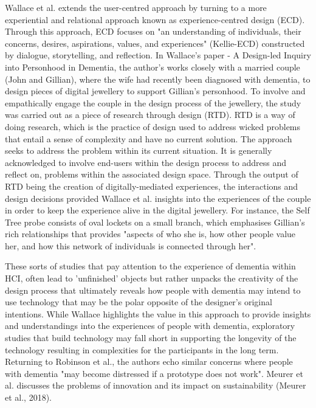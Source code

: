Wallace et al. extends the user-centred approach by turning to a more experiential and relational approach known as experience-centred design (ECD). Through this approach, ECD focuses on "an understanding of individuals, their concerns, desires, aspirations, values, and experiences" (Kellie-ECD) constructed by dialogue, storytelling, and reflection. In Wallace's paper - A Design-led Inquiry into Personhood in Dementia, the author's works closely with a married couple (John and Gillian), where the wife had recently been diagnosed with dementia, to design pieces of digital jewellery to support Gillian's personhood. To involve and empathically engage the couple in the design process of the jewellery, the study was carried out as a piece of research through design (RTD). RTD is a way of doing research, which is the practice of design used to address wicked problems that entail a sense of complexity and have no current solution. The approach seeks to address the problem within its current situation. It is generally acknowledged to involve end-users within the design process to address and reflect on, problems within the associated design space. Through the output of RTD being the creation of digitally-mediated experiences, the interactions and design decisions provided Wallace et al. insights into the experiences of the couple in order to keep the experience alive in the digital jewellery. For instance, the Self Tree probe consists of oval lockets on a small branch, which emphasises Gillian's rich relationships that provides "aspects of who she is, how other people value her, and how this network of individuals is connected through her".

These sorts of studies that pay attention to the experience of dementia within HCI, often lead to 'unfinished' objects but rather unpacks the creativity of the design process that ultimately reveals how people with dementia may intend to use technology that may be the polar opposite of the designer's original intentions. While Wallace highlights the value in this approach to provide insights and understandings into the experiences of people with dementia, exploratory studies that build technology may fall short in supporting the longevity of the technology resulting in complexities for the participants in the long term. Returning to Robinson et al., the authors echo similar concerns where people with dementia "may become distressed if a prototype does not work". Meurer et al. discusses the problems of innovation and its impact on sustainability (Meurer et al., 2018). 

